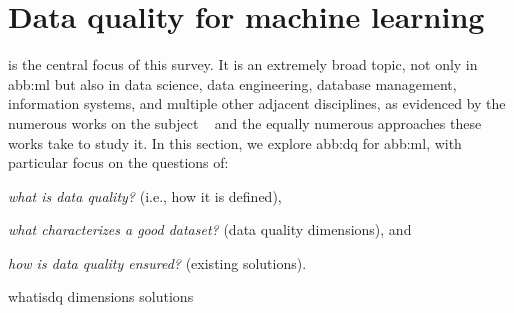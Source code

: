 \section{Data quality for machine learning}\label{sec:data_quality}

 is the central focus of this survey.
It is an extremely broad topic, not only in \gls{abb:ml} but also in
data science, data engineering, database management, information systems,
and multiple other adjacent disciplines,
as evidenced by the numerous works on the subject%
~\cite{%
  xuDataQualityMatters2023,%
  guptaDataQualityMachine2021,%
  olsonDataQualityAccuracy2003,%
  mahantiDataQualityDimensions2019,%
  renggliDataQualityDrivenView2021,%
  camachoQualityQualityOut2023,%
  gudivadaDataQualityConsiderations2017%
}
and the equally numerous approaches these works take to study it.
In this section, we explore \gls{abb:dq} for \gls{abb:ml},
with particular focus on the questions of:
\begin{enumerate*}[label=(\roman*)]
  \item \textit{what is data quality?} (i.e., how it is defined),
  \item \textit{what characterizes a good dataset?} (data quality dimensions), and
  \item \textit{how is data quality ensured?} (existing solutions).
\end{enumerate*}
{whatisdq}
{dimensions}
{solutions}